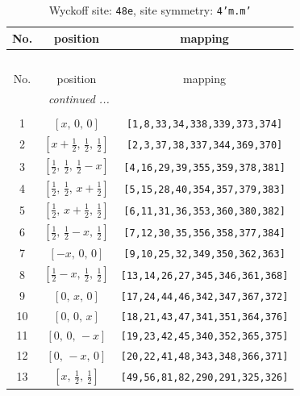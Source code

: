 \documentclass[fleqn,8pt]{jsarticle}
\begin{document}
\begin{longtable}{ccc}
\caption{Wyckoff site: {\tt 48e}, site symmetry: {\tt 4'm.m'}}
 \\
 \hline \hline
No. & position & mapping \\ \hline \endfirsthead

\multicolumn{2}{l}{\tablename\ \thetable{}} \\
 \hline \hline
No. & position & mapping \\ \hline \endhead

 \hline \hline
\multicolumn{2}{r}{\footnotesize\it continued ...} \\ \endfoot

 \hline \hline
\multicolumn{2}{r}{} \\ \endlastfoot

1 & $\left[ x,\, 0,\, 0 \right]$ & {\tt [1,8,33,34,338,339,373,374]} \\ \hline
2 & $\left[ x + \frac{1}{2},\, \frac{1}{2},\, \frac{1}{2} \right]$ & {\tt [2,3,37,38,337,344,369,370]} \\ \hline
3 & $\left[ \frac{1}{2},\, \frac{1}{2},\, \frac{1}{2} - x \right]$ & {\tt [4,16,29,39,355,359,378,381]} \\ \hline
4 & $\left[ \frac{1}{2},\, \frac{1}{2},\, x + \frac{1}{2} \right]$ & {\tt [5,15,28,40,354,357,379,383]} \\ \hline
5 & $\left[ \frac{1}{2},\, x + \frac{1}{2},\, \frac{1}{2} \right]$ & {\tt [6,11,31,36,353,360,380,382]} \\ \hline
6 & $\left[ \frac{1}{2},\, \frac{1}{2} - x,\, \frac{1}{2} \right]$ & {\tt [7,12,30,35,356,358,377,384]} \\ \hline
7 & $\left[ - x,\, 0,\, 0 \right]$ & {\tt [9,10,25,32,349,350,362,363]} \\ \hline
8 & $\left[ \frac{1}{2} - x,\, \frac{1}{2},\, \frac{1}{2} \right]$ & {\tt [13,14,26,27,345,346,361,368]} \\ \hline
9 & $\left[ 0,\, x,\, 0 \right]$ & {\tt [17,24,44,46,342,347,367,372]} \\ \hline
10 & $\left[ 0,\, 0,\, x \right]$ & {\tt [18,21,43,47,341,351,364,376]} \\ \hline
11 & $\left[ 0,\, 0,\, - x \right]$ & {\tt [19,23,42,45,340,352,365,375]} \\ \hline
12 & $\left[ 0,\, - x,\, 0 \right]$ & {\tt [20,22,41,48,343,348,366,371]} \\ \hline
13 & $\left[ x,\, \frac{1}{2},\, \frac{1}{2} \right]$ & {\tt [49,56,81,82,290,291,325,326]} \\ \hline

\end{longtable}
\end{document}
